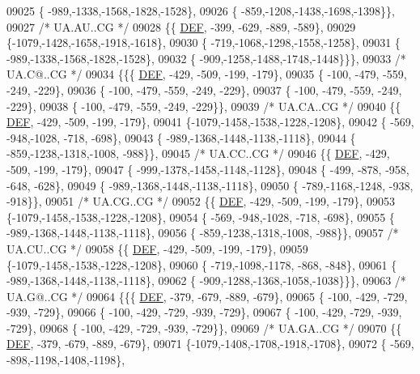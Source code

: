 \begin{DoxyCode}
09025 \{ -989,-1338,-1568,-1828,-1528\},
09026 \{ -859,-1208,-1438,-1698,-1398\}\},
09027 \textcolor{comment}{/* UA.AU..CG */}
09028 \{\{  \mbox{\hyperlink{1_88_84__epars_8h_a397419fc12b37ed479c8abb9d444d843}{DEF}}, -399, -629, -889, -589\},
09029 \{-1079,-1428,-1658,-1918,-1618\},
09030 \{ -719,-1068,-1298,-1558,-1258\},
09031 \{ -989,-1338,-1568,-1828,-1528\},
09032 \{ -909,-1258,-1488,-1748,-1448\}\}\},
09033 \textcolor{comment}{/* UA.C@..CG */}
09034 \{\{\{  \mbox{\hyperlink{1_88_84__epars_8h_a397419fc12b37ed479c8abb9d444d843}{DEF}}, -429, -509, -199, -179\},
09035 \{ -100, -479, -559, -249, -229\},
09036 \{ -100, -479, -559, -249, -229\},
09037 \{ -100, -479, -559, -249, -229\},
09038 \{ -100, -479, -559, -249, -229\}\},
09039 \textcolor{comment}{/* UA.CA..CG */}
09040 \{\{  \mbox{\hyperlink{1_88_84__epars_8h_a397419fc12b37ed479c8abb9d444d843}{DEF}}, -429, -509, -199, -179\},
09041 \{-1079,-1458,-1538,-1228,-1208\},
09042 \{ -569, -948,-1028, -718, -698\},
09043 \{ -989,-1368,-1448,-1138,-1118\},
09044 \{ -859,-1238,-1318,-1008, -988\}\},
09045 \textcolor{comment}{/* UA.CC..CG */}
09046 \{\{  \mbox{\hyperlink{1_88_84__epars_8h_a397419fc12b37ed479c8abb9d444d843}{DEF}}, -429, -509, -199, -179\},
09047 \{ -999,-1378,-1458,-1148,-1128\},
09048 \{ -499, -878, -958, -648, -628\},
09049 \{ -989,-1368,-1448,-1138,-1118\},
09050 \{ -789,-1168,-1248, -938, -918\}\},
09051 \textcolor{comment}{/* UA.CG..CG */}
09052 \{\{  \mbox{\hyperlink{1_88_84__epars_8h_a397419fc12b37ed479c8abb9d444d843}{DEF}}, -429, -509, -199, -179\},
09053 \{-1079,-1458,-1538,-1228,-1208\},
09054 \{ -569, -948,-1028, -718, -698\},
09055 \{ -989,-1368,-1448,-1138,-1118\},
09056 \{ -859,-1238,-1318,-1008, -988\}\},
09057 \textcolor{comment}{/* UA.CU..CG */}
09058 \{\{  \mbox{\hyperlink{1_88_84__epars_8h_a397419fc12b37ed479c8abb9d444d843}{DEF}}, -429, -509, -199, -179\},
09059 \{-1079,-1458,-1538,-1228,-1208\},
09060 \{ -719,-1098,-1178, -868, -848\},
09061 \{ -989,-1368,-1448,-1138,-1118\},
09062 \{ -909,-1288,-1368,-1058,-1038\}\}\},
09063 \textcolor{comment}{/* UA.G@..CG */}
09064 \{\{\{  \mbox{\hyperlink{1_88_84__epars_8h_a397419fc12b37ed479c8abb9d444d843}{DEF}}, -379, -679, -889, -679\},
09065 \{ -100, -429, -729, -939, -729\},
09066 \{ -100, -429, -729, -939, -729\},
09067 \{ -100, -429, -729, -939, -729\},
09068 \{ -100, -429, -729, -939, -729\}\},
09069 \textcolor{comment}{/* UA.GA..CG */}
09070 \{\{  \mbox{\hyperlink{1_88_84__epars_8h_a397419fc12b37ed479c8abb9d444d843}{DEF}}, -379, -679, -889, -679\},
09071 \{-1079,-1408,-1708,-1918,-1708\},
09072 \{ -569, -898,-1198,-1408,-1198\},

\end{DoxyCode}
